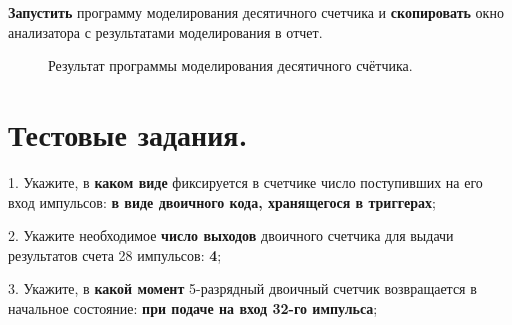 \documentclass[spec, och, otchet, hidelinks]{SCWorks}
\begin{document}
\newpage

\textbf{Запустить} программу моделирования десятичного счетчика и \textbf{скопировать} окно анализатора с результатами моделирования в отчет.

\begin{figure}[h]
	\caption{Результат программы моделирования десятичного счётчика.}
\end{figure}

\newpage

\section*{Тестовые задания.}

\par 1. Укажите, в \textbf{каком виде} фиксируется в счетчике число поступивших на его вход импульсов: \textbf{в виде двоичного кода, хранящегося в 
триггерах};

\par 2. Укажите необходимое \textbf{число выходов} двоичного счетчика для выдачи результатов
счета 28 импульсов: \textbf{4};

\par 3. Укажите, в \textbf{какой момент} 5-разрядный двоичный счетчик возвращается в начальное состояние: \textbf{при подаче на вход 32-го импульса};
\end{document}
